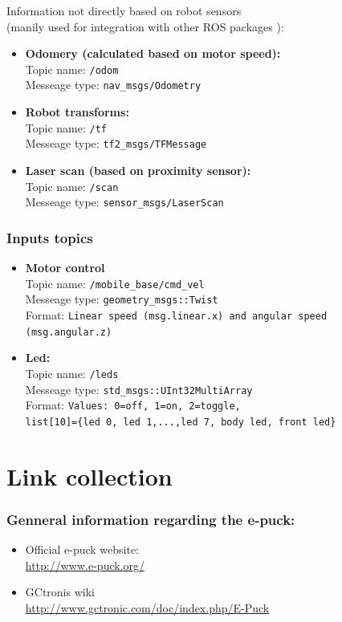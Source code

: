 \documentclass{article}
\newcommand{\stt}[1]{{\small\tt #1}}
\DeclareRobustCommand{\gobblefour}[5]{} %
\newcommand*{\SkipTocEntry}{\addtocontents{toc}{\gobblefour}}
\begin{document}
\noindent
Information not directly based on robot sensors 
\\ (manily used for integration with other ROS packages ):
\begin{itemize}
\item \textbf{Odomery (calculated based on motor speed): } 
\\Topic name: \stt{/odom} 
\\Messeage type: \stt{nav\_msgs/Odometry} 
%
\item \textbf{Robot transforms: } 
\\Topic name: \stt{/tf} 
\\Messeage type: \stt{tf2\_msgs/TFMessage} 
%
\item \textbf{Laser scan (based on proximity sensor): } 
\\Topic name: \stt{/scan} 
\\Messeage type: \stt{sensor\_msgs/LaserScan} 
\end{itemize}


\subsubsection*{Inputs topics}
\begin{itemize}
\item \textbf{Motor control } 
\\Topic name: \stt{/mobile\_base/cmd\_vel} 
\\Messeage type: \stt{geometry\_msgs::Twist}
\\Format: \stt{Linear speed (msg.linear.x) and angular speed (msg.angular.z)}
%
\item \textbf{Led: } 
\\Topic name: \stt{/leds} 
\\Messeage type: \stt{std\_msgs::UInt32MultiArray} 
\\Format: \stt{Values: 0=off, 1=on, 2=toggle, \\ list[10]=\{led 0, led 1,...,led 7, body led, front led\}}
\end{itemize}





\newpage
\section{Link collection}
\label{sec:links}

\SkipTocEntry
\subsubsection{Genneral information regarding the e-puck:}
\label{sec:link:gen}
\begin{itemize}
\item Official e-puck website: 
\\ \url{http://www.e-puck.org/}
\item GCtronis wiki 
\\ \url{http://www.gctronic.com/doc/index.php/E-Puck}
\end{itemize}
\end{document}
